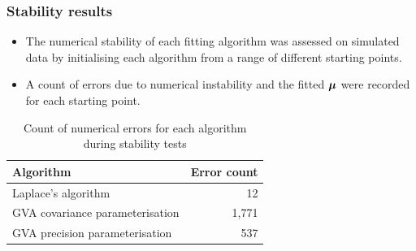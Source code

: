 \documentclass{beamer}
\begin{document}
			
	\begin{frame}
		\frametitle{Stability results}
				
				
		\begin{itemize}
			\item The numerical stability of each fitting algorithm was assessed on simulated data 
					by initialising each algorithm from a range of different starting points.
			\item A count of errors due to numerical instability and the fitted
				  ${\boldsymbol \mu}$ were recorded for each starting point.
		\end{itemize}				
		\begin{table}
			\caption{Count of numerical errors for each algorithm during stability tests}
			\label{tab:stability_results}
			\begin{tabular}{|l|r|}
				\hline
				Algorithm                       & Error count \\
				\hline
				Laplace's algorithm             & 12          \\
				GVA covariance parameterisation & 1,771       \\
				GVA precision parameterisation  & 537         \\
				\hline
			\end{tabular}
		\end{table}
	\end{frame}
		
\end{document}
